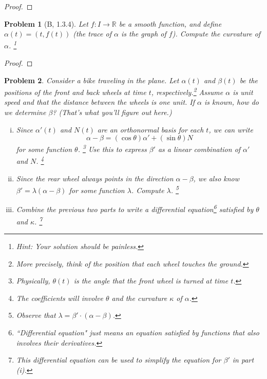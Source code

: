\documentclass[11pt]{article}
\newtheorem{problem}{Problem}
\begin{document}
\begin{proof}

\end{proof}

\pagebreak

\begin{problem}[B, 1.3.4]
Let $f:I\to\mathbb R$ be a smooth function, and define $\alpha(t)=(t,f(t))$ (the trace of $\alpha$ is the graph of $f$). Compute the curvature of $\alpha$. \footnote{Hint: Your solution should be painless. } 
\end{problem}

\begin{proof}

\end{proof}

\pagebreak

\begin{problem}
Consider a bike traveling in the plane. Let $\alpha(t)$ and $\beta(t)$ be the positions of the front and back wheels at time $t$, respectively.\footnote{More precisely, think of the position that each wheel touches the ground.} Assume $\alpha$ is unit speed and that the distance between the wheels is one unit. If $\alpha$ is known, how do we determine $\beta$? (That's what you'll figure out here.) 

\begin{enumerate}[(i)]
\item Since $\alpha'(t)$ and $N(t)$ are an orthonormal basis for each $t$, we can write 
\[\alpha-\beta=(\cos\theta) \alpha'+(\sin\theta) N\] for some function $\theta$. \footnote{Physically, $\theta(t)$ is the angle that the front wheel is turned at time $t$.} Use this to express $\beta'$ as a linear combination of $\alpha'$ and $N$. \footnote{The coefficients will involve $\theta$ and the curvature $\kappa$ of $\alpha$.} 

\item Since the rear wheel always points in the direction $\alpha-\beta$, we also know $\beta'=\lambda(\alpha-\beta)$ for some function $\lambda$. Compute $\lambda$. \footnote{Observe that $\lambda=\beta'\cdot(\alpha-\beta)$.}

\item Combine the previous two parts to write a differential equation\footnote{``Differential equation" just means an equation satisfied by functions that also involves their derivatives.} satisfied by $\theta$ and $\kappa$. \footnote{This differential equation can be used to simplify the equation for $\beta'$ in part (i).}
\end{enumerate} 
\end{problem}
\end{document}
